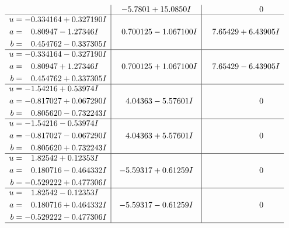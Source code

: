\documentclass[1p]{elsarticle_modified}
\theoremstyle{definition}
\begin{document}
$$\begin{array}{c|c|c}
 & -5.7801 + 15.0850 I & \phantom{-0.000000 } 0 \\ \hline\begin{aligned}
u &= -0.334164 + 0.327190 I \\
a &= \phantom{-}0.80947 - 1.27346 I \\
b &= \phantom{-}0.454762 - 0.337305 I\end{aligned}
 & \phantom{-}0.700125 - 1.067100 I & \phantom{-}7.65429 + 6.43905 I \\ \hline\begin{aligned}
u &= -0.334164 - 0.327190 I \\
a &= \phantom{-}0.80947 + 1.27346 I \\
b &= \phantom{-}0.454762 + 0.337305 I\end{aligned}
 & \phantom{-}0.700125 + 1.067100 I & \phantom{-}7.65429 - 6.43905 I \\ \hline\begin{aligned}
u &= -1.54216 + 0.53974 I \\
a &= -0.817027 + 0.067290 I \\
b &= \phantom{-}0.805620 - 0.732243 I\end{aligned}
 & \phantom{-}4.04363 - 5.57601 I & \phantom{-0.000000 } 0 \\ \hline\begin{aligned}
u &= -1.54216 - 0.53974 I \\
a &= -0.817027 - 0.067290 I \\
b &= \phantom{-}0.805620 + 0.732243 I\end{aligned}
 & \phantom{-}4.04363 + 5.57601 I & \phantom{-0.000000 } 0 \\ \hline\begin{aligned}
u &= \phantom{-}1.82542 + 0.12353 I \\
a &= \phantom{-}0.180716 - 0.464332 I \\
b &= -0.529222 + 0.477306 I\end{aligned}
 & -5.59317 + 0.61259 I & \phantom{-0.000000 } 0 \\ \hline\begin{aligned}
u &= \phantom{-}1.82542 - 0.12353 I \\
a &= \phantom{-}0.180716 + 0.464332 I \\
b &= -0.529222 - 0.477306 I\end{aligned}
 & -5.59317 - 0.61259 I & \phantom{-0.000000 } 0\\
 \hline 
 \end{array}$$\newpage$$\begin{array}{c|c|c}  

\end{array}$$
\end{document}
